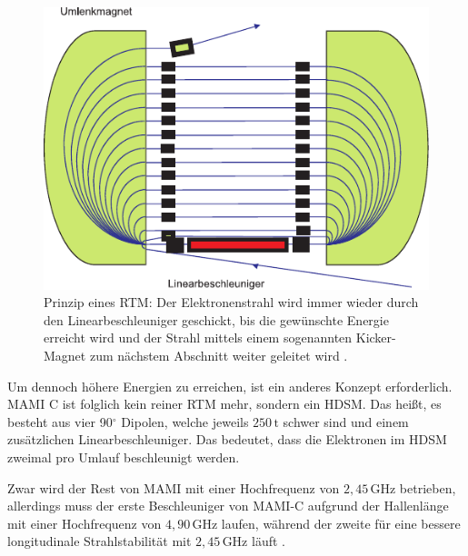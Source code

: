 \documentclass[a4paper,11pt,oneside,final,german,openbib,pdftex]{scrbook}
\begin{document}
{\begin{figure}[h!]
	\begin{center}
	\includegraphics{RTM}	
	\caption[Prinzip eines RTM]{Prinzip eines RTM: Der Elektronenstrahl wird immer wieder durch den Linearbeschleuniger geschickt, bis die gew\"unschte Energie erreicht wird und der Strahl mittels einem sogenannten Kicker-Magnet zum n\"achstem Abschnitt weiter geleitet wird \cite{KPh07}. }
	\label{fig.RTM}
\end{center}
\end{figure}

Um dennoch höhere Energien zu erreichen, ist ein anderes Konzept erforderlich. MAMI C ist folglich kein reiner RTM mehr, sondern ein HDSM. Das hei{\ss}t, es besteht aus vier 90$^{\circ}$ Dipolen, welche jeweils $250\, \text{t}$ schwer sind und einem zus\"atzlichen Linearbeschleuniger. 
Das bedeutet, dass die Elektronen im HDSM zweimal pro Umlauf beschleunigt werden.

Zwar wird der Rest von MAMI mit einer Hochfrequenz von $2,45\, \text{GHz}$ betrieben, allerdings muss der erste Beschleuniger von MAMI-C aufgrund der Hallenl\"ange mit einer Hochfrequenz von $4,90\, \text{GHz}$ laufen, w\"ahrend der zweite f\"ur eine bessere longitudinale Strahlstabilit\"at mit $2,45 \, \text{GHz}$ l\"auft \cite{Ca10}.

\begin{table}[h!]
\centering



\end{table}}
\end{document}
